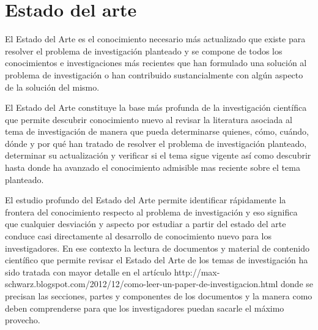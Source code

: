 
\chapter{Estado del arte}

El Estado del Arte es el conocimiento necesario más actualizado que existe para resolver el problema de investigación planteado y se compone de todos los conocimientos e investigaciones más recientes que han formulado una solución al problema de investigación o han contribuido sustancialmente con algún aspecto de la solución del mismo. 

El Estado del Arte constituye la base más profunda de la investigación científica que permite descubrir conocimiento nuevo al revisar la literatura asociada al tema de investigación de manera que pueda determinarse quienes, cómo, cuándo, dónde y por qué han tratado de resolver el problema de investigación planteado, determinar su actualización y verificar si el tema sigue vigente así como descubrir hasta donde ha avanzado el conocimiento admisible mas reciente sobre el tema planteado.

El estudio profundo del Estado del Arte permite identificar rápidamente la frontera del conocimiento respecto al problema de investigación y eso significa que cualquier desviación y aspecto por estudiar a partir del estado del arte conduce casi directamente al desarrollo de  conocimiento nuevo para los investigadores.
En ese contexto la lectura de documentos y material de contenido científico que permite revisar el Estado del Arte de los temas de investigación ha sido tratada con mayor detalle en el artículo http://max-schwarz.blogspot.com/2012/12/como-leer-un-paper-de-investigacion.html  donde se precisan las secciones, partes y componentes de los documentos y la manera como deben comprenderse para que los investigadores puedan sacarle el máximo provecho.
